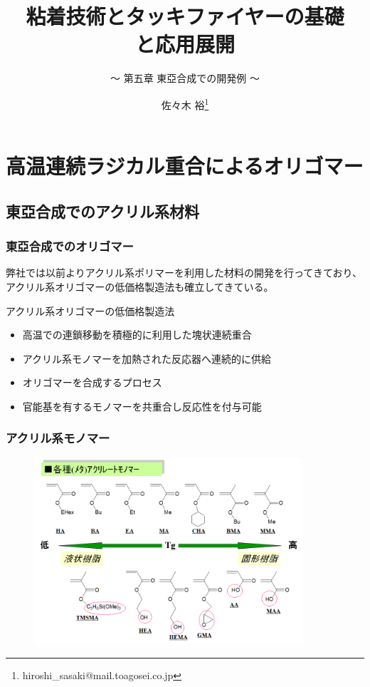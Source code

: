 \documentclass[12pt, dvipdfmx]{beamer}
\title{粘着技術とタッキファイヤーの基礎\\と応用展開}
\subtitle{ ～ 第五章 東亞合成での開発例 ～}
\author[東亞合成 佐々木]{佐々木 裕\thanks{hiroshi\_sasaki@mail.toagosei.co.jp}}
\institute[東亞合成]{東亞合成株式会社}
\date{}
\begin{document}
\maketitle

\begin{frame} 
    \tableofcontents[]
\end{frame} 

\section{高温連続ラジカル重合によるオリゴマー}
\subsection{東亞合成でのアクリル系材料}
\begin{frame}
	\frametitle{東亞合成でのオリゴマー}
		弊社では以前よりアクリル系ポリマーを利用した材料の開発を行ってきており、アクリル系オリゴマーの低価格製造法も確立してきている。

		\begin{block}{アクリル系オリゴマーの低価格製造法}
		\begin{itemize}
		\item 高温での連鎖移動を積極的に利用した塊状連続重合
		\item アクリル系モノマーを加熱された反応器へ連続的に供給
		\item オリゴマーを合成するプロセス
		\item 官能基を有するモノマーを共重合し反応性を付与可能
		\end{itemize}
		\end{block}
\end{frame}

\begin{frame}\frametitle{アクリル系モノマー}
\begin{figure}[!b]
	\begin{center}
		\includegraphics[width=100mm]{monomers.png}
	\end{center}
\end{figure}
\end{frame}
\end{document}
